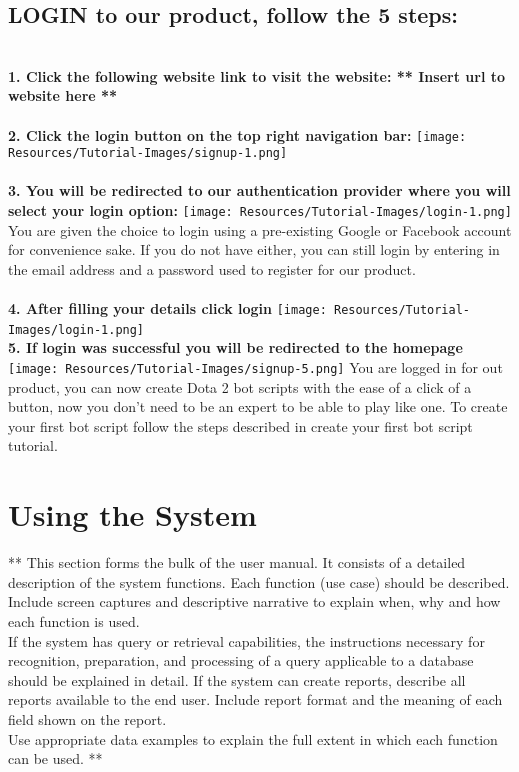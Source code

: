 \documentclass{article}
\begin{document}
\subsection*{LOGIN to our product, follow the 5 steps:}
\begin{flushleft}
\textbf{\\1. Click the following website link to visit the website: ** Insert url to website here **}\\
\textbf{\\2. Click the login button on the top right navigation bar:}
\texttt{[image: Resources/Tutorial-Images/signup-1.png]}\\
\textbf{\\3. You will be redirected to our authentication provider where you will select your login option:}
\texttt{[image: Resources/Tutorial-Images/login-1.png]}
\\You are given the choice to login using a pre-existing Google or Facebook account for convenience sake. If you do not have either, you can still login by entering in the email address and a password used to register for our product.\\
\textbf{\\4. After filling your details click login}
\texttt{[image: Resources/Tutorial-Images/login-1.png]}
\textbf{\\5. If login was successful you will be redirected to the homepage}
\texttt{[image: Resources/Tutorial-Images/signup-5.png]}
You are logged in for out product, you can now create Dota 2 bot scripts with the ease of a click of a button, now you don't need to be an expert to be able to play like one. To create your first bot script follow the steps described in create your first bot script tutorial. 
\end{flushleft}



\section{Using the System}
** This section forms the bulk of the user manual. It consists of a detailed description of the
system functions. Each function (use case) should be described. Include screen captures
and descriptive narrative to explain when, why and how each function is used.\\
If the system has query or retrieval capabilities, the instructions necessary for recognition,
preparation, and processing of a query applicable to a database should be explained in
detail. If the system can create reports, describe all reports available to the end user.
Include report format and the meaning of each field shown on the report.\\
Use appropriate data examples to explain the full extent in which each function can be
used. **
\end{document}
